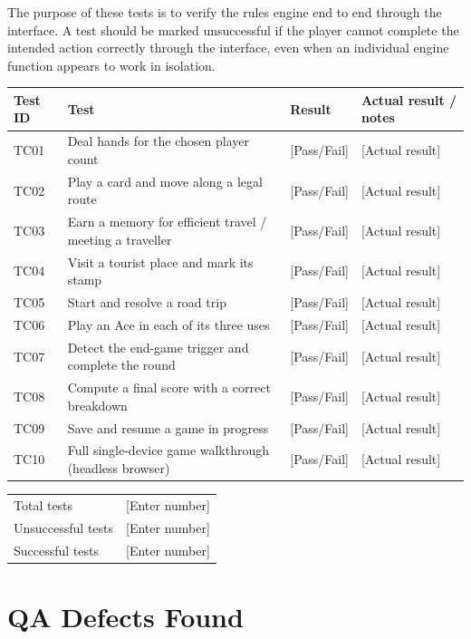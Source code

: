 \documentclass[11pt]{article}
\newcommand{\bracket}[1]{\textcolor{gray!70!black}{[#1]}}
\begin{document}
The purpose of these tests is to verify the rules engine end to end through the interface. A test should be marked unsuccessful if the player cannot complete the intended action correctly through the interface, even when an individual engine function appears to work in isolation.

\begin{tabularx}{\textwidth}{@{} l Y l Y @{}}
  \toprule
  \textbf{Test ID} & \textbf{Test} & \textbf{Result} & \textbf{Actual result / notes} \\
  \midrule
  TC01 & Deal hands for the chosen player count & \bracket{Pass/Fail} & \bracket{Actual result} \\
  TC02 & Play a card and move along a legal route & \bracket{Pass/Fail} & \bracket{Actual result} \\
  TC03 & Earn a memory for efficient travel / meeting a traveller & \bracket{Pass/Fail} & \bracket{Actual result} \\
  TC04 & Visit a tourist place and mark its stamp & \bracket{Pass/Fail} & \bracket{Actual result} \\
  TC05 & Start and resolve a road trip & \bracket{Pass/Fail} & \bracket{Actual result} \\
  TC06 & Play an Ace in each of its three uses & \bracket{Pass/Fail} & \bracket{Actual result} \\
  TC07 & Detect the end-game trigger and complete the round & \bracket{Pass/Fail} & \bracket{Actual result} \\
  TC08 & Compute a final score with a correct breakdown & \bracket{Pass/Fail} & \bracket{Actual result} \\
  TC09 & Save and resume a game in progress & \bracket{Pass/Fail} & \bracket{Actual result} \\
  TC10 & Full single-device game walkthrough (headless browser) & \bracket{Pass/Fail} & \bracket{Actual result} \\
  \bottomrule
\end{tabularx}

\vspace{6pt}
\begin{tabularx}{0.6\textwidth}{@{} l Y @{}}
  Total tests & \bracket{Enter number} \\
  Unsuccessful tests & \bracket{Enter number} \\
  Successful tests & \bracket{Enter number} \\
\end{tabularx}

\section{QA Defects Found}
\end{document}

